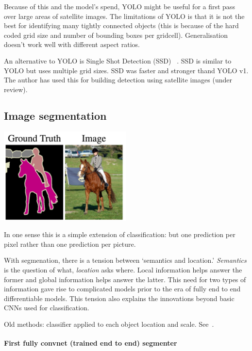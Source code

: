 \documentclass[12pt, a4paper, oneside, headinclude, footinclude]{article}
\begin{document}
Because of this and the model's spend, YOLO might be useful for a first pass
over large areas of satellite images. The limitations of YOLO is that it is
not the best for identifying many tightly connected objects (this is because
of the hard coded grid size and number of bounding boxes per gridcell).
Generalisation doesn't work well with different aspect ratios. 

An alternative to YOLO is Single Shot Detection (SSD) ~\cite{liu2016ssd}. SSD
is similar to YOLO but uses multiple grid sizes. SSD was faster and stronger
thand YOLO v1. The author has used this for building detection using satellite
images (under review).

\subsection{Image segmentation}

\includegraphics[width=0.5\textwidth]{Figures/segmentation-example.png}

In one sense this is a simple extension of classification: but one prediction
per pixel rather than one prediction per picture.

With segmenation, there is a tension between `semantics and location.'
\textit{Semantics} is the question of what, \textit{location} asks where.
Local information helps answer the former and global information helps answer
the latter. This need for two types of information gave rise to complicated
models prior to the era of fully end to end differentiable models. This
tension also explains the innovations beyond basic CNNs used for
classification.

Old methods: classifier applied to each object location and scale.
See~\cite{NIPS2015_5852}.

\paragraph{First fully convnet (trained end to end) segmenter}
\end{document}
